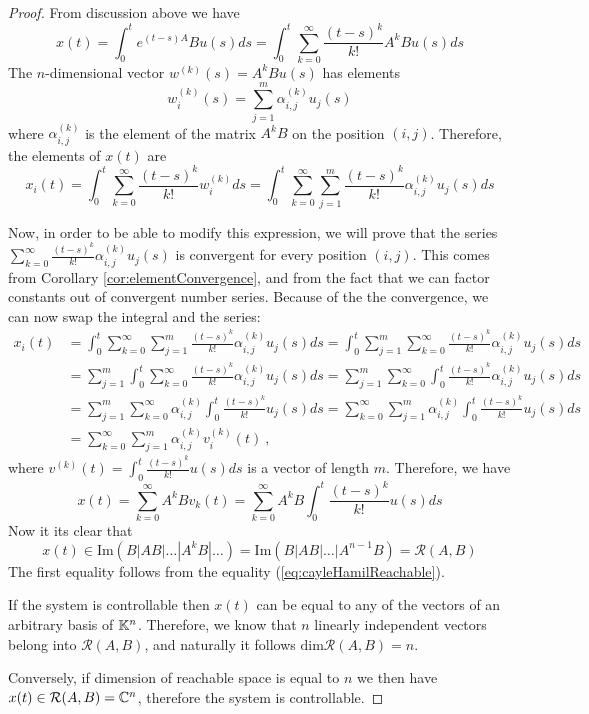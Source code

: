 \begin{proof}
	From discussion above we have 
	$$
		x(t)=\int^t_0e^{(t-s)A}Bu(s)ds
		=\int^t_0\sum^\infty_{k=0}\frac{(t-s)^k}{k!}A^kBu(s)ds
	$$
	The $n$-dimensional vector $w^{(k)}(s)=A^kBu(s)$ has elements $$w^{(k)}_i(s)=\sum^m_{j=1}\alpha^{(k)}_{i,j}u_j(s)$$ where $\alpha^{(k)}_{i,j}$ is the element of the matrix $A^kB$ on the position $(i,j)$. Therefore, the elements of $x(t)$ are
	$$
		x_i(t)
		=\int^t_0\sum^\infty_{k=0}\frac{(t-s)^k}{k!}w^{(k)}_ids
		=\int^t_0\sum^\infty_{k=0}\sum^m_{j=1}\frac{(t-s)^k}{k!}\alpha^{(k)}_{i,j}u_j(s)ds
	$$
	
	Now, in order to be able to modify this expression, we will prove that the series $\sum^\infty_{k=0}\frac{(t-s)^k}{k!}\alpha^{(k)}_{i,j}u_j(s)$ is convergent for every position $(i, j)$. This comes from Corollary \ref{cor:elementConvergence}, and from the fact that we can factor constants out of convergent number series. Because of the the convergence, we can now swap the integral and the series:
	\begin{align*}
		x_i(t)
		&=\int^t_0\sum^\infty_{k=0}\sum^m_{j=1}\frac{(t-s)^k}{k!}\alpha^{(k)}_{i,j}u_j(s)ds
		=\int^t_0\sum^m_{j=1}\sum^\infty_{k=0}\frac{(t-s)^k}{k!}\alpha^{(k)}_{i,j}u_j(s)ds
		\\
		&=\sum^m_{j=1}\int^t_0\sum^\infty_{k=0}\frac{(t-s)^k}{k!}\alpha^{(k)}_{i,j}u_j(s)ds
		=\sum^m_{j=1}\sum^\infty_{k=0}\int^t_0\frac{(t-s)^k}{k!}\alpha^{(k)}_{i,j}u_j(s)ds
		\\
		&=\sum^m_{j=1}\sum^\infty_{k=0}\alpha^{(k)}_{i,j}\int^t_0\frac{(t-s)^k}{k!}u_j(s)ds
		=\sum^\infty_{k=0}\sum^m_{j=1}\alpha^{(k)}_{i,j}\int^t_0\frac{(t-s)^k}{k!}u_j(s)ds
		\\
		&=\sum^\infty_{k=0}\sum^m_{j=1}\alpha^{(k)}_{i,j}v^{(k)}_i(t)\ ,
	\end{align*}
	where $v^{(k)}(t)=\int^t_0\frac{(t-s)^k}{k!}u(s)ds$ is a vector of length $m$. Therefore, we have 
	$$x(t)=\sum^\infty_{k=0}A^kBv_k(t)=\sum^\infty_{k=0}A^kB\int^t_0\frac{(t-s)^k}{k!}u(s)ds$$
	Now it its clear that $$x(t) \in \text{Im}(B|AB|\ldots|A^kB|\ldots)=\text{Im}(B|AB|\ldots|A^{n-1}B)=\mathcal{R}(A,B)$$ 
	The first equality follows from the equality (\ref{eq:cayleHamilReachable}).
	
	If the system is controllable then $x(t)$ can be equal to any of the vectors of an arbitrary basis of $\mathbb{K}^n$. Therefore, we know that $n$ linearly independent vectors belong into $\mathcal{R}(A,B)$, and naturally it follows $\text{dim}\mathcal{R}(A,B)=n$.

	Conversely, if dimension of reachable space is equal to $n$ we then have $x(t)\in\mathcal{R}(A,B)=\mathbb{C}^n$, therefore the system is controllable.
\end{proof}

